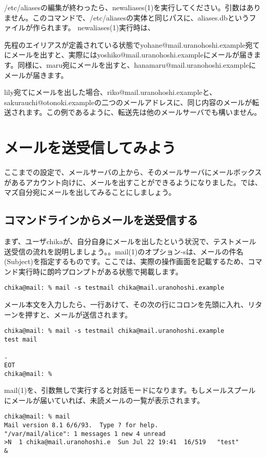 /etc/aliasesの編集が終わったら、newaliases(1)を実行してください。引数はありません。このコマンドで、/etc/aliasesの実体と同じパスに、aliases.dbというファイルが作られます。
newaliases(1)実行時は、

先程のエイリアスが定義されている状態でyohane@mail.uranohoshi.example宛てにメールを出すと、実際にはyoshiko@mail.uranohoshi.exampleにメールが届きます。同様に、maru宛にメールを出すと、hanamaru@mail.uranohoshi.exampleにメールが届きます。

lily宛てにメールを出した場合、riko@mail.uranohoshi.exampleと、sakurauchi@otonoki.exampleの二つのメールアドレスに、同じ内容のメールが転送されます。この例であるように、転送先は他のメールサーバでも構いません。

\section{メールを送受信してみよう}
ここまでの設定で、メールサーバの上から、そのメールサーバにメールボックスがあるアカウント向けに、メールを出すことができるようになりました。では、マズ自分宛にメールを出してみることにしましょう。

\subsection{コマンドラインからメールを送受信する}

まず、ユーザchikaが、自分自身にメールを出したという状況で、テストメール送受信の流れを説明しましょう。。mail(1)のオプション-sは、メールの件名(Subject)を指定するものです。ここでは、実際の操作画面を記載するため、コマンド実行時に朗吟プロンプトがある状態で掲載します。

\begin{verbatim}
chika@mail: % mail -s testmail chika@mail.uranohoshi.example
\end{verbatim}

メール本文を入力したら、一行あけて、その次の行にコロンを先頭に入れ、リターンを押すと、メールが送信されます。

\begin{verbatim}
chika@mail: % mail -s testmail chika@mail.uranohoshi.example
test mail

.
EOT
chika@mail: % 
\end{verbatim}

mail(1)を、引数無しで実行すると対話モードになります。もしメールスプールにメールが届いていれば、未読メールの一覧が表示されます。

\begin{verbatim}
chika@mail: % mail
Mail version 8.1 6/6/93.  Type ? for help.
"/var/mail/alice": 1 messages 1 new 4 unread
>N  1 chika@mail.uranohoshi.e  Sun Jul 22 19:41  16/519   "test"
&
\end{verbatim}

